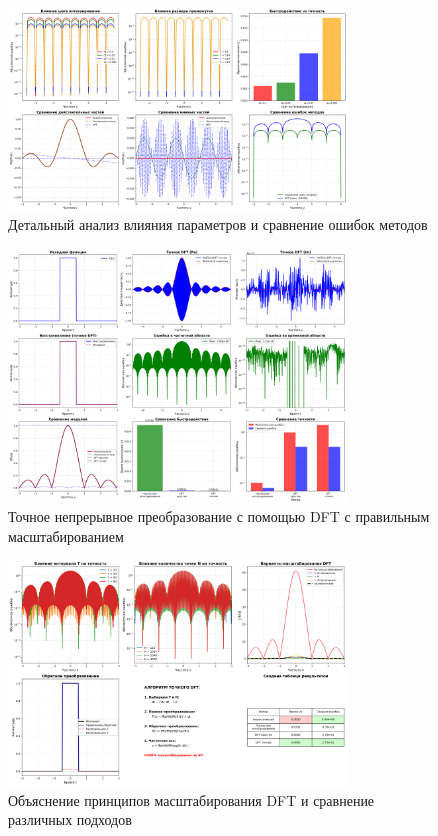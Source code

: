 \begin{figure}[H]
    \centering
    \includegraphics[width=0.8\textwidth]{images/task1/detailed_analysis.png}
    \caption{Детальный анализ влияния параметров и сравнение ошибок методов}
    \label{fig:detailed_analysis}
\end{figure}

\begin{figure}[H]
    \centering
    \includegraphics[width=0.8\textwidth]{images/task1/precise_fourier_comparison.png}
    \caption{Точное непрерывное преобразование с помощью DFT с правильным масштабированием}
    \label{fig:precise_fourier}
\end{figure}

\begin{figure}[H]
    \centering
    \includegraphics[width=0.8\textwidth]{images/task1/dft_comparison.png}
    \caption{Объяснение принципов масштабирования DFT и сравнение различных подходов}
    \label{fig:dft_comparison}
\end{figure}

